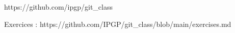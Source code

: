 https://github.com/ipgp/git_class

Exercices : 
https://github.com/IPGP/git_class/blob/main/exercises.md